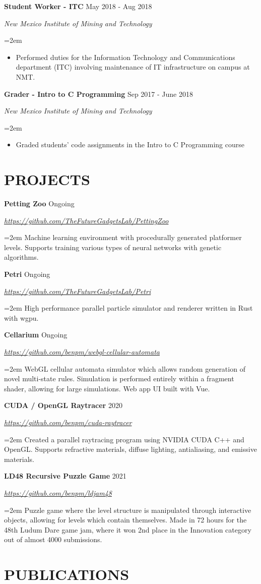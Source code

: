 \documentclass[paper=a4,fontsize=11pt]{scrartcl} %
\newcommand{\sepspace}{\vspace*{1em}}		%
\newcommand{\sym}{\raisebox{1pt}{$\blacktriangleright$}}
\newcommand{\showurl}[1]{\href{#1}{#1}}
\newcommand{\NewPart}[1]{\section*{\sym \mbox{} \MakeUppercase{#1}}}
\newcommand{\EducationEntry}[5]{
		\Large \noindent \textbf{#1} \hfill \\   %
		\normalsize \noindent \textit{#2} \hfill	  %
		\colorbox{yel}{\color{blk}#3} \par  %
		\noindent \textit{#4} \par        %
		\noindent\hangindent=2em\hangafter=0 \small #5 %
		\normalsize \par
		\sepspace}
\newcommand{\WorkEntry}[4]{				  %
		\noindent \textbf{#1} \hfill      %
		\colorbox{yel}{\color{blk}#2} \par  %
		\noindent \textit{#3} \par              %
		\noindent\hangindent=2em\hangafter=0 \small #4 %
		\normalsize \par
		\sepspace}
\begin{document}
\WorkEntry{Student Worker - ITC}
	{May 2018 - Aug 2018}{New Mexico Institute of Mining and Technology}{\noindent
	\begin{itemize}
		\item Performed duties for the Information Technology and Communications department (ITC)
			involving maintenance of IT infrastructure on campus at NMT.
	\end{itemize}
}

\WorkEntry{Grader - Intro to C Programming}
	{Sep 2017 - June 2018}{New Mexico Institute of Mining and Technology}{\noindent
	\begin{itemize}
		\item Graded students' code assignments in the Intro to C Programming course
	\end{itemize}
}


\NewPart{Projects}{}

\WorkEntry{Petting Zoo}{Ongoing}{\showurl{https://github.com/TheFutureGadgetsLab/PettingZoo}}{
	Machine learning environment with procedurally generated platformer levels.
	Supports training various types of neural networks with genetic algorithms.
}

\WorkEntry{Petri}{Ongoing}{\showurl{https://github.com/TheFutureGadgetsLab/Petri}}{
	High performance parallel particle simulator and renderer written in Rust with wgpu.
}

\WorkEntry{Cellarium}{Ongoing}{\showurl{https://github.com/benpm/webgl-cellular-automata}}{
	WebGL cellular automata simulator which allows random generation of novel multi-state rules.
	Simulation is performed entirely within a fragment shader, allowing for large simulations.
	Web app UI built with Vue.
}

\WorkEntry{CUDA / OpenGL Raytracer}{2020}{\showurl{https://github.com/benpm/cuda-raytracer}}{
	Created a parallel raytracing program using NVIDIA CUDA C++ and OpenGL.
	Supports refractive materials, diffuse lighting, antialiasing, and emissive materials.
}

\WorkEntry{LD48 Recursive Puzzle Game}{2021}{\showurl{https://github.com/benpm/ldjam48}}{
	Puzzle game where the level structure is manipulated through interactive objects,
	allowing for levels which contain themselves.
	Made in 72 hours for the 48th Ludum Dare game jam, where it won 2nd place in the Innovation category
	out of almost 4000 submissions.
}


\NewPart{Publications}{}
\end{document}
